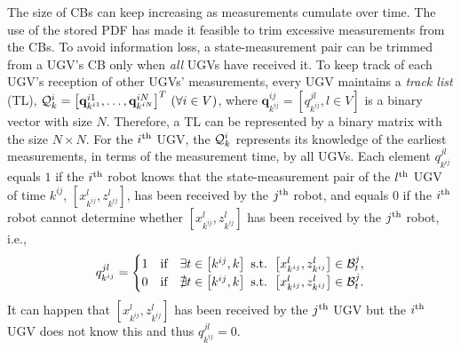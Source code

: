 	
	The size of CBs can keep increasing as measurements cumulate over time. 
	The use of the stored PDF has made it feasible to trim excessive measurements from the CBs.
	To avoid information loss, a state-measurement pair can be trimmed from a UGV's CB only when \textit{all} UGVs have received it.
	To keep track of each UGV's reception of other UGVs' measurements, every UGV maintains a \textit{track list} (TL), $\mathcal{Q}^i_k=\left[\mathbf{q}^{i1}_{k^{i1}},\dots, \mathbf{q}^{iN}_{k^{iN}}\right]^T \,(\forall i\in V)$, where $\mathbf{q}^{ij}_{k^{ij}}=\left[q^{jl}_{k^{ij}}, l\in V\right]$ is a binary vector with size $N$.
	Therefore, a TL can be represented by a binary matrix with the size $N\times N$.
	For the $i^\text{th}$ UGV, the $\mathcal{Q}^i_k$ represents its knowledge of the earliest measurements, in terms of the measurement time, by all UGVs.	
	Each element $q^{jl}_{k^{ij}}$ equals $1$ if the $i^\text{th}$ robot knows that the state-measurement pair of the $l^\text{th}$ UGV of time $k^{ij}$, $\left[x^l_{k^{ij}},z^l_{k^{ij}}\right]$, has been received by the $j^\text{th}$ robot, and equals $0$ if the $i^\text{th}$ robot cannot determine whether $\left[x^l_{k^{ij}},z^l_{k^{ij}}\right]$ has been received by the $j^\text{th}$ robot, i.e.,
	\small\begin{equation}\label{eqn:tl_entry}
	q^{jl}_{k^{ij}}=
	\begin{cases}
	1 & \text{if}\quad \exists t\in\left[k^{ij}, k\right] \text{ s.t. } \left[x^l_{k^{ij}},z^l_{k^{ij}}\right]\in \mathcal{B}^j_t,\\
	0 & \text{if}\quad \nexists t\in\left[k^{ij}, k\right] \text{ s.t. } \left[x^l_{k^{ij}},z^l_{k^{ij}}\right]\in \mathcal{B}^j_t.
	\end{cases}
	\end{equation}\normalsize
	It can happen that $\left[x^l_{k^{ij}},z^l_{k^{ij}}\right]$ has been received by the $j^\text{th}$ UGV but the $i^\text{th}$ UGV does not know this and thus $q^{jl}_{k^{ij}}=0$.
	
